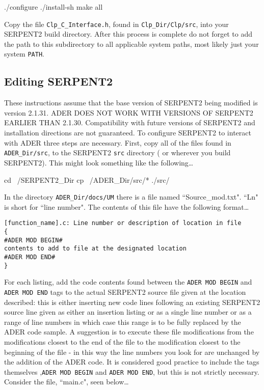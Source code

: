 \begin{li}
./configure
./install-sh
make all
\end{li}

Copy the file \texttt{Clp\_C\_Interface.h}, found in \texttt{Clp\_Dir/Clp/src},
 into your SERPENT2 build directory. 
After this process is complete do not forget to add the path to this
subdirectory to all applicable system paths, most likely just your system
\texttt{PATH}.


\subsection{Editing SERPENT2}\label{ssec:edit}
These instructions assume that the base version of SERPENT2 being modified
is version 2.1.31. ADER DOES NOT WORK WITH VERSIONS OF SERPENT2 EARLIER THAN
2.1.30.
Compatibility with future versions of SERPENT2 and installation directions
are not guaranteed.
To configure SERPENT2 to interact with ADER three steps are necessary. First,
copy all of the files found in \texttt{ADER\_Dir/src}, to the SERPENT2
\texttt{src} directory ( or wherever you build SERPENT2).
This might look something like the following\ldots

\begin{li}
cd ~/SERPENT2_Dir
cp ~/ADER_Dir/src/* ./src/
\end{li}

In the directory \texttt{ADER\_Dir/docs/UM} there is a file named 
``Source\_mod.txt". ``Ln" is short for ``line number".
The contents of this file have the following format\ldots

\begin{lstlisting}
[function_name].c: Line number or description of location in file
{
#ADER MOD BEGIN#
contents to add to file at the designated location
#ADER MOD END#
}
\end{lstlisting}

For each listing, add the code contents found between the
\texttt{ADER MOD BEGIN} and \texttt{ADER MOD END} tags to the
actual SERPENT2 source file given at the location
described: this is either inserting new code lines following an existing
SERPENT2 source line given as either an insertion listing or as a single line
number or as a range of line numbers in which case this range is to be fully
replaced by the ADER code sample. 
A suggestion is to execute these file modifications
from the modifications closest to the end of the file to the
modification closest to the beginning of the file - in this way
the line numbers you look for are unchanged by the addition of
the ADER code.
It is considered good practice to include the tags themselves
,\texttt{ADER MOD BEGIN} and \texttt{ADER MOD END}, 
but this is not strictly necessary.
Consider the file, ``main.c", seen below\ldots


